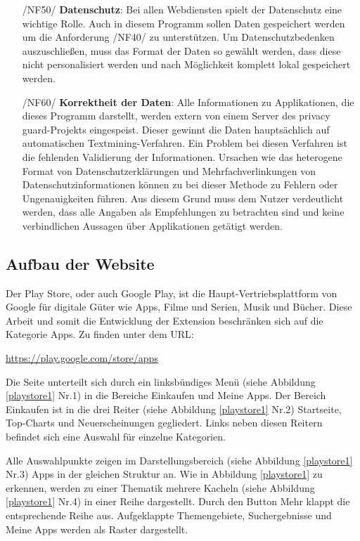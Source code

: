 \begin{itemize}
	\item[/NF50/] \textbf{Datenschutz}:
	Bei allen Webdiensten spielt der Datenschutz eine wichtige Rolle. Auch in diesem Programm sollen Daten gespeichert werden um die Anforderung /NF40/ zu unterstützen. Um Datenschutzbedenken auszuschließen, muss das Format der Daten so gewählt werden, dass diese nicht personalisiert werden und nach Möglichkeit komplett lokal gespeichert werden.
	
	\item[/NF60/] \textbf{Korrektheit der Daten}:
	Alle Informationen zu Applikationen, die dieses Programm darstellt, werden extern von einem Server des privacy guard-Projekts eingespeist. Dieser gewinnt die Daten hauptsächlich auf automatischen Textmining-Verfahren. Ein Problem bei diesen Verfahren ist die fehlenden Validierung der Informationen. Ursachen wie das heterogene Format von Datenschutzerklärungen und Mehrfachverlinkungen von Datenschutzinformationen können zu bei dieser Methode zu Fehlern oder Ungenauigkeiten führen. Aus diesem Grund muss dem Nutzer verdeutlicht werden, dass alle Angaben als Empfehlungen zu betrachten sind und keine verbindlichen Aussagen über Applikationen getätigt werden.
	
\end{itemize}

\subsection{Aufbau der Website}
\label{ss:aufbauwebsite}

Der Play Store, oder auch \glqq Google Play\grqq{}, ist die Haupt-Vertriebsplattform von Google für digitale Güter wie Apps, Filme und Serien, Musik und Bücher. Diese Arbeit und somit die Entwicklung der Extension beschränken sich auf die Kategorie \glqq Apps\grqq{}. Zu finden unter dem URL:

\glqq \url{https://play.google.com/store/apps}\grqq{}

Die Seite unterteilt sich durch ein linksbündiges Menü (siehe Abbildung \ref{playstore1} Nr.1) in die Bereiche \glqq Einkaufen\grqq{} und \glqq Meine Apps\grqq{}. Der Bereich \glqq Einkaufen\grqq{} ist in die drei Reiter (siehe Abbildung \ref{playstore1} Nr.2) \glqq Startseite\grqq{}, \glqq Top-Charts\grqq{} und \glqq Neuerscheinungen\grqq{} gegliedert. Links neben diesen Reitern befindet sich eine Auswahl für einzelne Kategorien.


Alle Auswahlpunkte zeigen im Darstellungsbereich (siehe Abbildung \ref{playstore1} Nr.3) Apps in der gleichen Struktur an. Wie in Abbildung \ref{playstore1} zu erkennen, werden zu einer Thematik mehrere Kacheln (siehe Abbildung \ref{playstore1} Nr.4) in einer Reihe dargestellt. Durch den Button \glqq Mehr\grqq{} klappt die entsprechende Reihe aus. Aufgeklappte Themengebiete, Suchergebnisse und \glqq Meine Apps\grqq{} werden als Raster dargestellt.

